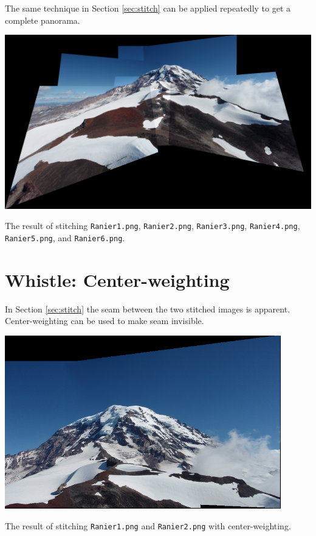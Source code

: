\documentclass[letterpaper]{article}
\begin{document}
The same technique in Section \ref{sec:stitch} can be applied repeatedly to get a
complete panorama.

\begin{center}
  \includegraphics[width=\textwidth]{all_stitched.png}
  
  The result of stitching \texttt{Ranier1.png}, \texttt{Ranier2.png},
  \texttt{Ranier3.png}, \texttt{Ranier4.png}, \texttt{Ranier5.png}, and
  \texttt{Ranier6.png}.
\end{center}

\section*{Whistle: Center-weighting}

In Section \ref{sec:stitch} the seam between the two stitched images is
apparent. Center-weighting can be used to make seam invisible.

\begin{center}
  \includegraphics[width=0.9\textwidth]{4_center_weighted.png}
  
  The result of stitching \texttt{Ranier1.png} and \texttt{Ranier2.png} with
  center-weighting.
\end{center}
\end{document}
